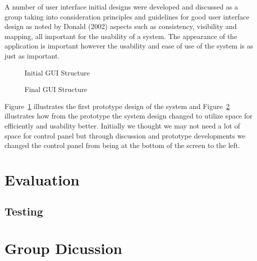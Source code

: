 \documentclass[11pt]{article}
\begin{document}
	A number of user interface initial designs were developed and discussed as a group taking into consideration principles and guidelines for good user interface design as noted by Donald \cite{Norman} (2002) aspects such as consistency, visibility and mapping, all important for the usability of a system. The appearance of the application is important however the usability and ease of use of the system is as just as important.
	\begin{figure}[h]
	\caption{Initial GUI Structure}
	\label{initialGUI}
	\end{figure}
	
	\begin{figure}[h]
	\caption{Final GUI Structure}
	\label{finalGUI}
	\end{figure}
	Figure~\ref{initialGUI} illustrates the first prototype design of the system and Figure~\ref{finalGUI} illustrates how from the prototype the system design changed to utilize space for efficiently and usability better. 
	Initially we thought we may not need a lot of space for control panel but through discussion and prototype developments we changed the control panel from being at the bottom of the screen to the left. 
	
	\section{Evaluation} %
	\subsection{Testing} %
	\section{Group Dicussion}
\end{document}
